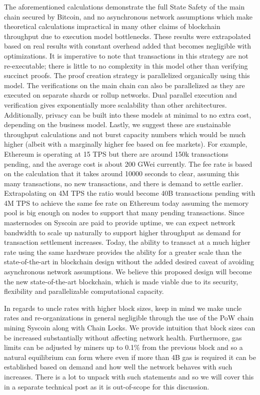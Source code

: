 \documentclass[peerreview]{ieeesyscoin}
\begin{document}
The aforementioned calculations demonstrate the full State Safety of the main chain secured by Bitcoin, and no asynchronous network assumptions which make theoretical calculations impractical in many other claims of blockchain throughput due to execution model bottlenecks. These results were extrapolated based on real results with constant overhead added that becomes negligible with optimizations. It is imperative to  note that transactions in this strategy are not re-executable; there is little to no complexity in this model other than verifying succinct proofs. The proof creation strategy is parallelized organically using this model. The verifications on the main chain can also be parallelized as they are executed on separate shards or rollup networks. Dual parallel execution and verification gives exponentially more scalability than other architectures. Additionally, privacy can be built into these models at minimal to no extra cost, depending on the business model. Lastly, we suggest  these are sustainable throughput calculations and not burst capacity numbers which would be much higher (albeit with a marginally higher fee based on fee markets). For example, Ethereum is operating at 15 TPS but there are around 150k transactions pending, and the average cost is about 200 GWei currently. The fee rate is based on the calculation that it  takes around 10000 seconds to clear, assuming this many transactions, no new transactions, and there is demand to settle earlier. Extrapolating on 4M TPS the ratio would become 40B transactions pending with 4M TPS to achieve the same fee rate on Ethereum today assuming the memory pool is big enough on nodes to support that many pending transactions. Since masternodes on Syscoin are paid to provide uptime, we can expect network bandwidth to scale up naturally to support higher throughput as demand for transaction settlement increases. Today, the ability to transact at a much higher rate using the same hardware provides the ability for a greater scale than the state-of-the-art in blockchain design without the added desired caveat of avoiding asynchronous network assumptions. We believe this proposed design will become the new state-of-the-art blockchain, which is made viable due to its security, flexibility and parallelizable computational capacity.

In regards to uncle rates with higher block sizes, keep in mind we make uncle rates and re-organizations in general negligible through the use of the PoW chain mining Syscoin along with Chain Locks. We provide intuition that block sizes can be increased substantially without affecting network health. Furthermore, gas limits can be adjusted by miners up to 0.1\% from the previous block and so a natural equilibrium can form where even if more than 4B gas is required it can be established based on demand and how well the network behaves with such increases. There is a lot to unpack with such statements and so we will cover this in a separate technical post as it is out-of-scope for this discussion. 
\end{document}
